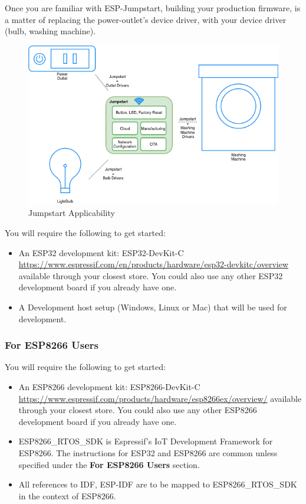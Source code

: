 \documentclass[main.tex]{subfiles}
\begin{document}
Once you are familiar with ESP-Jumpstart, building your production firmware, is a matter of replacing the power-outlet's device driver, with your device driver (bulb, washing machine).

\begin{figure}[h!]
    \centering
    \includegraphics[scale=0.7]{../../_static/jumpstart-outlet-blocks.png}
    \caption{Jumpstart Applicability}
    \label{fig:jumpstart_applicability}
\end{figure}

You will require the following to get started:
\begin{itemize}
\item An ESP32 development kit: ESP32-DevKit-C \url{https://www.espressif.com/en/products/hardware/esp32-devkitc/overview} available through your closest store. You could also use any other ESP32 development board if you already have one.
\item A Development host setup (Windows, Linux or Mac) that will be used for development.
\end{itemize}

\subsubsection{For ESP8266 Users}\label{sec:for_esp8266_users}
You will require the following to get started:
\begin{itemize}
\item An ESP8266 development kit: ESP8266-DevKit-C \url{https://www.espressif.com/products/hardware/esp8266ex/overview/} available through your closest store. You could also use any other ESP8266 development board if you already have one.
\item ESP8266\_RTOS\_SDK is Espressif’s IoT Development Framework for ESP8266. The instructions for ESP32 and ESP8266 are common unless specified under the \textbf{For ESP8266 Users} section.
\item All references to IDF, ESP-IDF are to be mapped to ESP8266\_RTOS\_SDK in the context of ESP8266.
\end{itemize}
\end{document}
